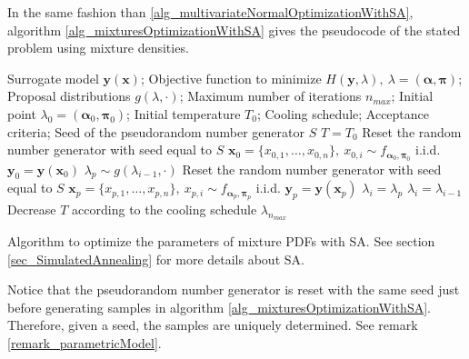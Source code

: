 In the same fashion than \ref{alg_multivariateNormalOptimizationWithSA}, algorithm \ref{alg_mixturesOptimizationWithSA} gives the pseudocode of the stated problem using mixture densities.

\begin{algorithm}%
\SetAlgoLined
   Surrogate model $\pmb{y}(\pmb{x})$; Objective function to minimize $H(\pmb{y}, \lambda), \ \lambda = (\pmb{\alpha},\pmb{\pi})$; Proposal distributions $g(\lambda,\cdot)$; Maximum number of iterations $n_{max}$; Initial point $\lambda_0 = (\pmb{\alpha}_0,\pmb{\pi}_0)$; Initial temperature $T_0$; Cooling schedule; Acceptance criteria; Seed of the pseudorandom number generator $S$\;
  $T = T_0$\;
  Reset the random number generator with seed equal to $S$\;
  $\pmb{x}_0 = \{x_{0,1},\dots,x_{0,n}\}, \ x_{0,i} \sim f_{\pmb{\alpha}_0,\pmb{\pi}_0}$  i.i.d.\;
  $\pmb{y}_0 = \pmb{y}(\pmb{x}_0)$\;
  {
    $\lambda_p \sim g(\lambda_{i-1},\cdot)$\;
    Reset the random number generator with seed equal to $S$\;
    $\pmb{x}_p = \{x_{p,1},\dots,x_{p,n}\}, \ x_{p,i} \sim f_{\pmb{\alpha}_p,\pmb{\pi}_p}$  i.i.d.\;
    $\pmb{y}_p = \pmb{y}(\pmb{x}_p)$\;
    {
      $\lambda_i = \lambda_p$\;
    }
    \Else
    {
      $\lambda_i = \lambda_{i-1}$\;
    }
    Decrease $T$ according to the cooling schedule\;
  }
   $\lambda_{n_{max}}$\;
\caption[Optimizing the parameters of mixture PDFs with SA]
{
  Algorithm to optimize the parameters of mixture PDFs with SA. See section \ref{sec_SimulatedAnnealing} for more details about SA.
}
\label{alg_mixturesOptimizationWithSA}
\end{algorithm}

\begin{remark}
  Notice that the pseudorandom number generator is reset with the same seed just before generating samples in algorithm \ref{alg_mixturesOptimizationWithSA}.
Therefore, given a seed, the samples are uniquely determined. See remark \ref{remark_parametricModel}. 
\end{remark}

